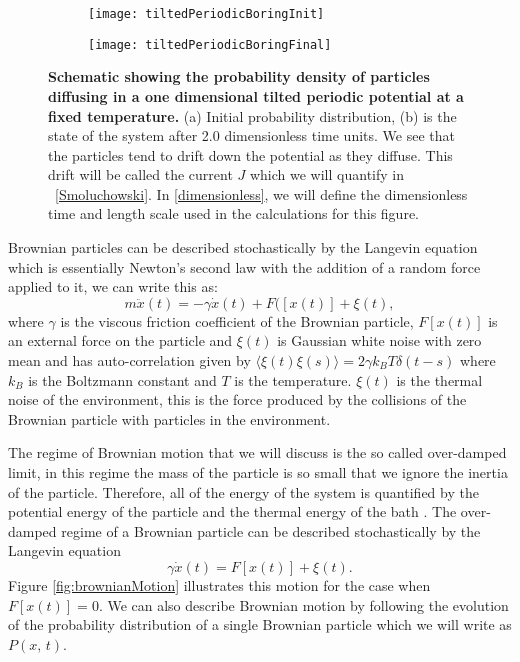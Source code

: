 \begin{figure}[tb]
	\begin{subfigure}{0.49\textwidth}
		\texttt{[image: tiltedPeriodicBoringInit]}
		\caption{\label{fig:Init}}
	\end{subfigure}
\begin{subfigure}{0.49\textwidth}
		\texttt{[image: tiltedPeriodicBoringFinal]}
		\caption{\label{fig:Final}}
\end{subfigure}
\caption{\textbf{Schematic showing the probability density of particles diffusing in a one dimensional tilted periodic potential at a fixed temperature.} (a) Initial probability distribution, (b) is the state of the system after 2.0 dimensionless time units. We see that the particles tend to drift down the potential as they diffuse. This drift will be called the current $J$ which we will quantify in ~\autoref{Smoluchowski}. In \autoref{dimensionless}, we will define the dimensionless time and length scale used in the calculations for this figure.}
\label{fig:Schematic}
\end{figure}

Brownian particles can be described stochastically by the Langevin equation which is essentially Newton's second law with the addition of a random force applied to it, we can write this as:
\begin{equation}
m \ddot{x}(t) = -\gamma \dot{x} (t) + F([x(t)] + \xi(t), 
\end{equation}
where $\gamma$ is the viscous friction coefficient of the Brownian particle, $F[x(t)]$ is an external force on the particle and $\xi(t)$ is Gaussian white noise with zero mean and has auto-correlation given by $\langle \xi(t) \xi(s) \rangle = 2 \gamma k_B T \delta(t - s)$ where $k_B$ is the Boltzmann constant and $T$ is the temperature. $\xi(t)$ is the thermal noise of the environment, this is the force produced by the collisions of the Brownian particle with particles in the environment.

The regime of Brownian motion that we will discuss is the so called over-damped limit, in this regime the mass of the particle is so small that we ignore the inertia of the particle. Therefore, all of the energy of the system is quantified by the potential energy of the particle and the thermal energy of the bath \cite{Streater1997,Streater1997a,Streater2000,Streater1997b}. The over-damped regime of a Brownian particle can be described stochastically by the Langevin equation 
\begin{equation}
	\gamma \dot x(t) = F[x(t)] + \xi(t).  \label{eqn:langevin}
\end{equation}
Figure \ref{fig:brownianMotion} illustrates this motion for the case when $F[x(t)] = 0$. We can also describe Brownian motion by following the evolution of the probability distribution of a single Brownian particle which we will write as $P(x, \, t)$.

